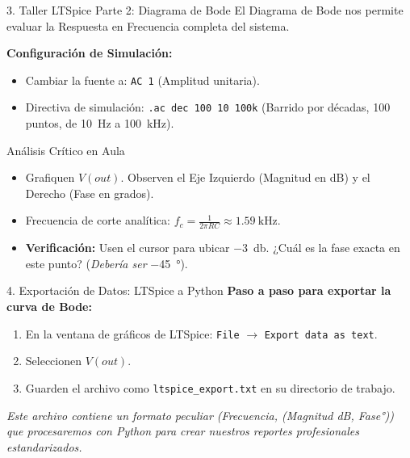 \documentclass[aspectratio=169, 10pt]{beamer}
\begin{document}
\begin{frame}{3. Taller LTSpice Parte 2: Diagrama de Bode}
    El Diagrama de Bode nos permite evaluar la Respuesta en Frecuencia completa del sistema.
    
    \vspace{0.3cm}
    \textbf{Configuración de Simulación:}
    \begin{itemize}
        \item Cambiar la fuente a: \texttt{AC 1} (Amplitud unitaria).
        \item Directiva de simulación: \texttt{.ac dec 100 10 100k} (Barrido por décadas, 100 puntos, de \SI{10}{\hertz} a \SI{100}{\kilo\hertz}).
    \end{itemize}
    
    \vspace{0.3cm}
    \begin{block}{Análisis Crítico en Aula}
        \begin{itemize}
            \item Grafiquen $V(out)$. Observen el Eje Izquierdo (Magnitud en dB) y el Derecho (Fase en grados).
            \item Frecuencia de corte analítica: $f_c = \frac{1}{2\pi RC} \approx \SI{1.59}{\kilo\hertz}$.
            \item \textbf{Verificación:} Usen el cursor para ubicar \SI{-3}{\decibel}. ¿Cuál es la fase exacta en este punto? (\textit{Debería ser} \SI{-45}{\degree}).
        \end{itemize}
    \end{block}
\end{frame}

\begin{frame}{4. Exportación de Datos: LTSpice a Python}
    \textbf{Paso a paso para exportar la curva de Bode:}
    \begin{enumerate}
        \item En la ventana de gráficos de LTSpice: \texttt{File} $\rightarrow$ \texttt{Export data as text}.
        \item Seleccionen $V(out)$.
        \item Guarden el archivo como \texttt{ltspice\_export.txt} en su directorio de trabajo.
    \end{enumerate}
    
    \vspace{0.3cm}
    \textit{Este archivo contiene un formato peculiar (Frecuencia, (Magnitud dB, Fase°)) que procesaremos con Python para crear nuestros reportes profesionales estandarizados.}
\end{frame}
\end{document}
